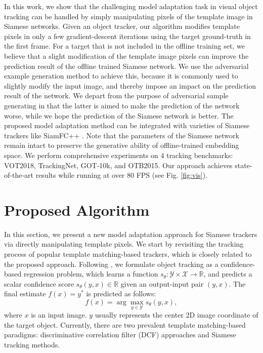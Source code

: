In this work, we show that the challenging model adaptation task in visual object tracking can be handled by simply manipulating pixels of the template image in Siamese networks. Given an object tracker, our algorithm modifies template pixels in only a few gradient-descent iterations using the target ground-truth in the first frame. For a target that is not included in the offline training set, we believe that a slight modification of the template image pixels can improve the prediction result of the offline trained Siamese network. We use the adversarial example generation method to achieve this, because it is commonly used to slightly modify the input image, and thereby impose an impact on the prediction result of the network. We depart from the purpose of adversarial sample generating in that the latter is aimed to make the prediction of the network worse, while we hope the prediction of the Siamese network is better. The proposed model adaptation method can be integrated with varieties of Siamese trackers like SiamFC++ \cite{SiamFC++}. Note that the parameters of the Siamese network remain intact to preserve the generative ability of offline-trained embedding space. We perform comprehensive experiments on 4 tracking benchmarks: VOT2018\cite{kristan2018sixth}, TrackingNet\cite{muller2018trackingnet}, GOT-10k\cite{GOT-10k}, and OTB2015\cite{OTB}. Our approach achieves state-of-the-art results while running at over 80 FPS (see Fig. \ref{fig:vis}).

\section{Proposed Algorithm}
In this section, we present a new model adaptation approach for Siamese trackers via directly manipulating template pixels. We start by revisiting the tracking process of popular template matching-based trackers, which is closely related to the proposed approach. Following \cite{Danelljan_2020_CVPR}, we formulate object tracking as a confidence-based regression problem, which learns a function $s_\theta:\mathcal{Y\times X\rightarrow \mathbb R}$, and predicts a scalar confidence score $s_\theta(y,x)\in\mathbb R$ given an output-input pair $(y,x)$. The final estimate $f(x)=y^*$ is predicted as follows:
\begin{equation}
    f(x) = \arg\max_{y\in \mathcal Y}s_\theta (y,x),
\end{equation}
where $x$ is an input image. $y$ usually represents the center 2D image coordinate of the target object. Currently, there are two prevalent template matching-based paradigms: discriminative correlation filter (DCF) approaches and Siamese tracking methods.

